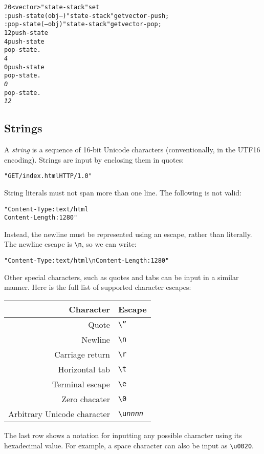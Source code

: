 \documentclass[english]{article}
\providecommand{\tabularnewline}{\\}
\begin{document}
{\begin{alltt}
20 <vector> "state-stack" set
: push-state ( obj -- ) "state-stack" get vector-push ;
: pop-state ( -- obj ) "state-stack" get vector-pop ;
12 push-state
4 push-state
pop-state .
\emph{4}
0 push-state
pop-state .
\emph{0}
pop-state .
\emph{12}
\end{alltt}

\subsection{Strings}

A \emph{string} is a sequence of 16-bit Unicode characters (conventionally,
in the UTF16 encoding). Strings are input by enclosing them in quotes:

\begin{alltt}
"GET /index.html HTTP/1.0"
\end{alltt}
String literals must not span more than one line. The following is
not valid:

\begin{alltt}
"Content-Type: text/html
Content-Length: 1280"
\end{alltt}
Instead, the newline must be represented using an escape, rather than
literally. The newline escape is \texttt{\textbackslash{}n}, so we
can write:

\begin{alltt}
"Content-Type: text/html\textbackslash{}nContent-Length: 1280"
\end{alltt}
Other special characters, such as quotes and tabs can be input in
a similar manner. Here is the full list of supported character escapes:

\begin{tabular}{|r|l|}
\hline 
Character&
Escape\tabularnewline
\hline
\hline 
Quote&
\texttt{\textbackslash{}''}\tabularnewline
\hline 
Newline&
\texttt{\textbackslash{}n}\tabularnewline
\hline 
Carriage return&
\texttt{\textbackslash{}r}\tabularnewline
\hline 
Horizontal tab&
\texttt{\textbackslash{}t}\tabularnewline
\hline 
Terminal escape&
\texttt{\textbackslash{}e}\tabularnewline
\hline 
Zero chacater&
\texttt{\textbackslash{}0}\tabularnewline
\hline 
Arbitrary Unicode character&
\texttt{\textbackslash{}u}\texttt{\emph{nnnn}}\tabularnewline
\hline
\end{tabular}

The last row shows a notation for inputting any possible character
using its hexadecimal value. For example, a space character can also
be input as \texttt{\textbackslash{}u0020}.

}
\end{document}
